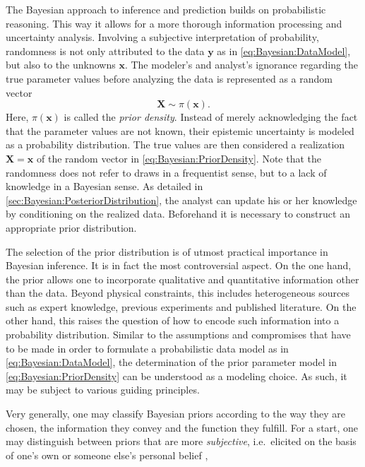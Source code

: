 The Bayesian approach to inference and prediction builds on probabilistic reasoning.
This way it allows for a more thorough information processing and uncertainty analysis.
Involving a subjective interpretation of probability, randomness is not only attributed to the data \(\bm{y}\) as in \cref{eq:Bayesian:DataModel}, but also to the unknowns \(\bm{x}\).
The modeler's and analyst's ignorance regarding the true parameter values before analyzing the data is represented as a random vector
\begin{equation} \label{eq:Bayesian:PriorDensity}
  \bm{X} \sim \pi(\bm{x}).
\end{equation}
Here, \(\pi(\bm{x})\) is called the \emph{prior density}.
Instead of merely acknowledging the fact that the parameter values are not known, their epistemic uncertainty is modeled as a probability distribution.
The true values are then considered a realization \(\bm{X} = \bm{x}\) of the random vector in \cref{eq:Bayesian:PriorDensity}.
Note that the randomness does not refer to draws in a frequentist sense, but to a lack of knowledge in a Bayesian sense.
As detailed in \cref{sec:Bayesian:PosteriorDistribution}, the analyst can update his or her knowledge by conditioning on the realized data.
Beforehand it is necessary to construct an appropriate prior distribution.
\par %
The selection of the prior distribution is of utmost practical importance in Bayesian inference.
It is in fact the most controversial aspect.
On the one hand, the prior allows one to incorporate qualitative and quantitative information other than the data.
Beyond physical constraints, this includes heterogeneous sources such as expert knowledge, previous experiments and published literature.
On the other hand, this raises the question of how to encode such information into a probability distribution.
Similar to the assumptions and compromises that have to be made in order to formulate a probabilistic data model as in \cref{eq:Bayesian:DataModel},
the determination of the prior parameter model in \cref{eq:Bayesian:PriorDensity} can be understood as a modeling choice.
As such, it may be subject to various guiding principles.
\par %
Very generally, one may classify Bayesian priors according to the way they are chosen, the information they convey and the function they fulfill.
For a start, one may distinguish between priors that are more \emph{subjective},
i.e.\ elicited on the basis of one's own or someone else's personal belief \cite{Uncertainty:Ayyub2001,Uncertainty:OHagan2006},
